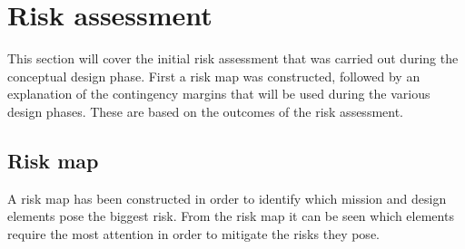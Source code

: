 \section{Risk assessment} 
\label{ch:risk}
This section will cover the initial risk assessment that was carried out during the conceptual design phase. First a risk map was constructed, followed by an explanation of the contingency margins that will be used during the various design phases. These are based on the outcomes of the risk assessment.

\subsection{Risk map}
 A risk map has been constructed in order to identify which mission and design elements pose the biggest risk. From the risk map it can be seen which elements require the most attention in order to mitigate the risks they pose. 


